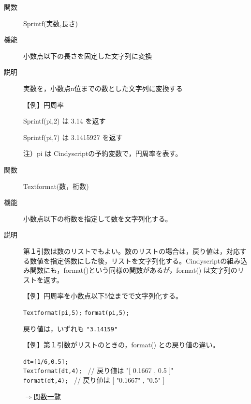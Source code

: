 \documentclass[papersize,a4paper,12pt,uplatex]{jsarticle}
\begin{document}
\begin{description}
\vspace{\baselineskip}
\hypertarget{sprintf}{}
\item[関数]Sprintf(実数,長さ)
\item[機能]小数点以下の長さを固定した文字列に変換
\item[説明]実数を，小数点n位までの数とした文字列に変換する

\vspace{\baselineskip}
【例】円周率

 Sprintf(pi,2) は 3.14 を返す

 Sprintf(pi,7) は 3.1415927 を返す

注）pi は Cindyscriptの予約変数で，円周率を表す。%

\vspace{\baselineskip}
\hypertarget{textformat}{}
\item[関数]Textformat(数，桁数)
\item[機能]小数点以下の桁数を指定して数を文字列化する。
\item[説明]第１引数は数のリストでもよい。数のリストの場合は，戻り値は，対応する数値を指定係数にした後，リストを文字列化する。Cindyscriptの組み込み関数にも，format()という同様の関数があるが，format() は文字列のリストを返す。

\vspace{\baselineskip}
【例】円周率を小数点以下5位までで文字列化する。

\hspace{10mm} \verb|Textformat(pi,5);|
\hspace{10mm} \verb|format(pi,5);|

戻り値は，いずれも \verb|"3.14159"|

\vspace{\baselineskip}
【例】第１引数がリストのときの，format() との戻り値の違い。

\hspace{10mm} \verb|dt=[1/6,0.5];|\\
\hspace{10mm} \verb|Textformat(dt,4); | // 戻り値は "[ 0.1667 , 0.5 ]" \\
\hspace{10mm} \verb|format(dt,4); | // 戻り値は [ "0.1667" , "0.5" ] \\

\begin{flushright}\hyperlink{functionlist}{$\Rightarrow$関数一覧}\end{flushright}


\end{description}
\end{document}
